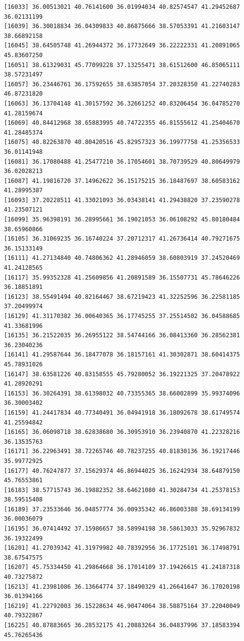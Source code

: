 \documentclass[
  letterpaper,
  DIV=11,
  numbers=noendperiod]{scrartcl}
\begin{document}
\begin{verbatim}
[16033] 36.00513021 40.76141600 36.01994034 40.82574547 41.29452687 36.02131199
[16039] 36.30018834 36.04309833 40.86875666 38.57053391 41.21603147 38.66892158
[16045] 38.64505748 41.26944372 36.17732649 36.22222331 41.20891065 45.83607250
[16051] 38.61329031 45.77099228 37.13255471 38.61512600 46.85065111 38.57231497
[16057] 36.23446761 36.17592655 38.63857054 37.20328350 41.22740283 46.87231820
[16063] 36.13704148 41.30157592 36.32661252 40.83206454 36.04785270 41.28159674
[16069] 40.84412968 38.65883995 40.74722355 46.81555612 41.25404670 41.28485374
[16075] 40.82263870 40.80420516 45.82957323 36.19977758 41.25356533 36.01141948
[16081] 36.17080488 41.25477210 36.17054601 38.70739529 40.80649979 36.02028213
[16087] 41.19816720 37.14962622 36.15175215 36.18487697 38.60583162 41.28995387
[16093] 37.20228511 41.33021093 36.03438141 41.29438820 37.23590278 41.23507121
[16099] 35.96398191 36.28995661 36.19021053 36.06108292 45.80180484 38.65960866
[16105] 36.31069235 36.16740224 37.20712317 41.26736414 40.79271675 36.15133149
[16111] 41.27134840 40.74806362 41.28946059 38.60803919 37.24520469 41.24128565
[16117] 35.99352328 41.25609856 41.20891589 36.15507731 45.78646226 36.18851891
[16123] 38.55491494 40.82164467 38.67219423 41.32252596 36.22581185 37.20499974
[16129] 41.31170382 36.00640365 36.17745255 37.25514502 36.04588685 41.33681996
[16135] 36.21522035 36.26955122 38.54744166 36.08413360 36.28562381 36.23040236
[16141] 41.29587644 36.18477078 36.18157161 41.30302871 38.60414375 45.78931026
[16147] 38.63581226 40.83158555 45.79280052 36.19221325 37.20478922 41.28920291
[16153] 36.30264391 38.61398032 40.73355365 38.66002899 35.99374096 36.30003402
[16159] 41.24417834 40.77340491 36.04941918 36.18092678 38.61749574 41.25594842
[16165] 36.06098718 38.62838680 36.30953910 36.23940870 41.22328216 36.13535763
[16171] 36.22963491 38.72265746 40.78237255 40.81830136 36.19217446 35.99772925
[16177] 40.76247877 37.15629374 46.86944025 36.16242934 38.64879150 45.76553861
[16183] 38.57715743 36.19882352 38.64621080 41.30284734 41.25378153 38.59515408
[16189] 37.23533646 36.04857774 36.00935342 46.86003388 38.69134199 36.00036079
[16195] 36.07414492 37.15986657 38.58994198 38.58613033 35.92967832 36.19322499
[16201] 41.27039342 41.31979982 40.78392956 36.17725101 36.17498791 38.67547575
[16207] 45.75334450 41.29864668 36.17014109 37.19426615 41.24187318 40.73275872
[16213] 41.23981086 36.13664774 37.18490329 41.26641647 36.17020198 36.01394166
[16219] 41.22792003 36.15228634 46.90474064 38.58875164 37.22040049 40.79322867
[16225] 40.87883665 36.28532175 41.20883264 36.04837996 37.18583394 45.76265436

\end{verbatim}
\end{document}
